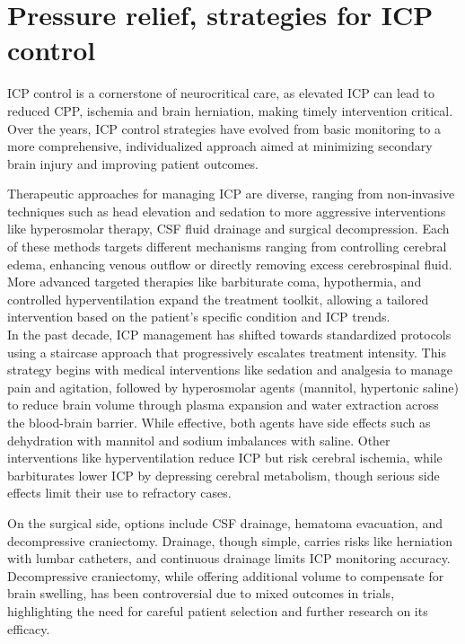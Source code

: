   \section[Pressure relief, strategies for ICP control]{Pressure relief, strategies for ICP control}
ICP control is a cornerstone of neurocritical care, as elevated ICP can lead to reduced CPP, ischemia and brain herniation, making timely intervention critical. Over the years, ICP control strategies have evolved from basic monitoring to a more comprehensive, individualized approach aimed at minimizing secondary brain injury and improving patient outcomes.

Therapeutic approaches for managing ICP are diverse, ranging from non-invasive techniques such as head elevation and sedation to more aggressive interventions like hyperosmolar therapy, CSF fluid drainage and surgical decompression. Each of these methods targets different mechanisms ranging from controlling cerebral edema, enhancing venous outflow or directly removing excess cerebrospinal fluid. More advanced targeted therapies like barbiturate coma, hypothermia, and controlled hyperventilation expand the treatment toolkit, allowing a tailored intervention based on the patient’s specific condition and ICP trends.\\

In the past decade, ICP management has shifted towards standardized protocols using a staircase approach\cite{stocchettiTraumaticIntracranialHypertension2014a} that progressively escalates treatment intensity. This strategy begins with medical interventions like sedation and analgesia to manage pain and agitation, followed by hyperosmolar agents (mannitol, hypertonic saline) to reduce brain volume through plasma expansion and water extraction across the blood-brain barrier. While effective, both agents have side effects such as dehydration with mannitol and sodium imbalances with saline. Other interventions like hyperventilation reduce ICP but risk cerebral ischemia, while barbiturates lower ICP by depressing cerebral metabolism, though serious side effects limit their use to refractory cases.

On the surgical side, options include CSF drainage, hematoma evacuation, and decompressive craniectomy. Drainage, though simple, carries risks like herniation with lumbar catheters, and continuous drainage limits ICP monitoring accuracy. Decompressive craniectomy, while offering additional volume to compensate for brain swelling, has been controversial due to mixed outcomes in trials, highlighting the need for careful patient selection and further research on its efficacy.


